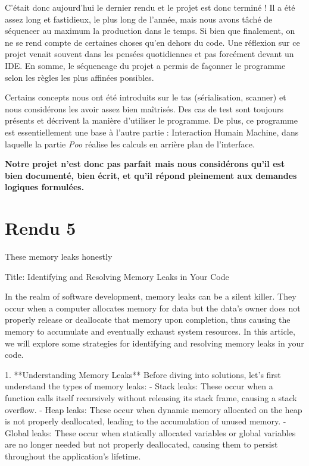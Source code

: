 \documentclass{mytex}
\begin{document}
C'était donc aujourd'hui le dernier rendu et le projet est donc terminé ! Il a été assez long et fastidieux, le plus long de l'année, mais nous avons tâché de séquencer au maximum la production dans le temps. Si bien que finalement, on ne se rend compte de certaines choses qu'en dehors du code. Une réflexion sur ce projet venait souvent dans les pensées quotidiennes et pas forcément devant un IDE. En somme, le séquencage du projet a permis de façonner le programme selon les règles les plus affinées possibles.

Certains concepts nous ont été introduits sur le tas (sérialisation, scanner) et nous considérons les avoir assez bien maîtrisés. Des cas de test sont toujours présents et décrivent la manière d'utiliser le programme. De plus, ce programme est essentiellement une base à l'autre partie : Interaction Humain Machine, dans laquelle la partie \textit{Poo} réalise les calculs en arrière plan de l'interface.

\textbf{Notre projet n'est donc pas parfait mais nous considérons qu'il est bien documenté, bien écrit, et qu'il répond pleinement aux demandes logiques formulées.}

\section{Rendu 5}

These memory leaks honestly

Title: Identifying and Resolving Memory Leaks in Your Code

In the realm of software development, memory leaks can be a silent killer. They occur when a computer allocates memory for data but the data's owner does not properly release or deallocate that memory upon completion, thus causing the memory to accumulate and eventually exhaust system resources. In this article, we will explore some strategies for identifying and resolving memory leaks in your code.

1. **Understanding Memory Leaks**
   Before diving into solutions, let's first understand the types of memory leaks:
   - Stack leaks: These occur when a function calls itself recursively without releasing its stack frame, causing a stack overflow.
   - Heap leaks: These occur when dynamic memory allocated on the heap is not properly deallocated, leading to the accumulation of unused memory.
   - Global leaks: These occur when statically allocated variables or global variables are no longer needed but not properly deallocated, causing them to persist throughout the application's lifetime.
\end{document}
